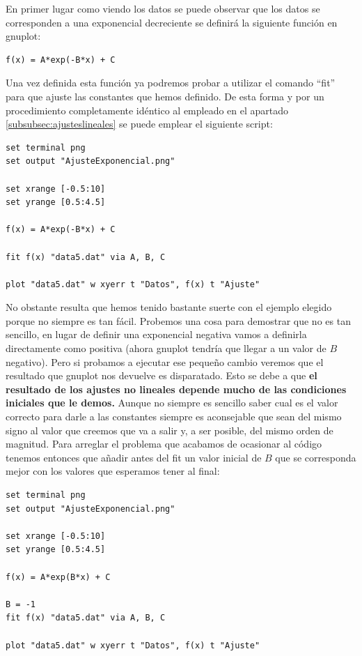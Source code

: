 \documentclass[11pt,a4paper,twoside,pdf]{article}
\numberwithin{equation}{section}
\begin{document}
En primer lugar como viendo los datos se puede observar que los datos se corresponden a una exponencial decreciente se definirá la siguiente función en gnuplot:

\begin{lstlisting}[language=Gnuplot]
f(x) = A*exp(-B*x) + C
\end{lstlisting}

Una vez definida esta función ya podremos probar a utilizar el comando ``fit'' para que ajuste las constantes que hemos definido. De esta forma y por un procedimiento completamente idéntico al empleado en el apartado \ref{subsubsec:ajusteslineales} se puede emplear el siguiente script:

\begin{lstlisting}[language=Gnuplot]
set terminal png
set output "AjusteExponencial.png"

set xrange [-0.5:10]
set yrange [0.5:4.5]

f(x) = A*exp(-B*x) + C

fit f(x) "data5.dat" via A, B, C

plot "data5.dat" w xyerr t "Datos", f(x) t "Ajuste"
\end{lstlisting}

No obstante resulta que hemos tenido bastante suerte con el ejemplo elegido porque no siempre es tan fácil. Probemos una cosa para demostrar que no es tan sencillo, en lugar de definir una exponencial negativa vamos a definirla directamente como positiva (ahora gnuplot tendría que llegar a un valor de $B$ negativo). Pero si probamos a ejecutar ese pequeño cambio veremos que el resultado que gnuplot nos devuelve es disparatado. Esto se debe a que \textbf{el resultado de los ajustes no lineales depende mucho de las condiciones iniciales que le demos.} Aunque no siempre es sencillo saber cual es el valor correcto para darle a las constantes siempre es aconsejable que sean del mismo signo al valor que creemos que va a salir y, a ser posible, del mismo orden de magnitud. Para arreglar el problema que acabamos de ocasionar al código tenemos entonces que añadir antes del fit un valor inicial de $B$ que se corresponda mejor con los valores que esperamos tener al final: 

\begin{lstlisting}[language=Gnuplot]
set terminal png
set output "AjusteExponencial.png"

set xrange [-0.5:10]
set yrange [0.5:4.5]

f(x) = A*exp(B*x) + C

B = -1
fit f(x) "data5.dat" via A, B, C

plot "data5.dat" w xyerr t "Datos", f(x) t "Ajuste"
\end{lstlisting}
\end{document}
